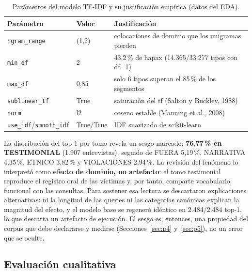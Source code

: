 \documentclass[11pt]{tg_usta}
\begin{document}
\begin{table}[htbp]
    \centering
    \caption{Parámetros del modelo TF-IDF y su justificación empírica (datos del EDA).}
    \small
    \setlength{\tabcolsep}{5pt}
    \begin{tabular}{l l p{7.1cm}}
    \toprule
    Parámetro & Valor & Justificación \\
    \midrule
    \texttt{ngram\_range} & (1,2) & colocaciones de dominio que los unigramas pierden \\
    \texttt{min\_df} & 2 & 43,2\,\% de hapax (14.365/33.277 tipos con df=1) \\
    \texttt{max\_df} & 0,85 & solo 6 tipos superan el 85\,\% de los segmentos \\
    \texttt{sublinear\_tf} & True & saturación del tf (Salton y Buckley, 1988) \\
    \texttt{norm} & l2 & coseno estable (Manning et al., 2008) \\
    \texttt{use\_idf}/\texttt{smooth\_idf} & True/True & IDF suavizado de scikit-learn \\
    \bottomrule
    \end{tabular}
    \label{tab:config-tfidf}
\end{table}

La distribución del top-1 por tomo revela un sesgo marcado: \textbf{76,77\,\% en TESTIMONIAL} (1.907 entrevistas), seguido de FUERA 5,19\,\%, NARRATIVA 4,35\,\%, ETNICO 3,82\,\% y VIOLACIONES 2,94\,\%. La revisión del fenómeno lo interpretó como \textbf{efecto de dominio, no artefacto}: el tomo testimonial reproduce el registro oral de las víctimas \cite{castillejo2023escuchar} y, por tanto, comparte vocabulario funcional con las consultas. Para sostener esa lectura se descartaron explicaciones alternativas: ni la longitud de las queries ni las categorías canónicas explican la magnitud del efecto, y el modelo base se regeneró idéntico en 2.484/2.484 top-1, lo que descarta un artefacto de ejecución. El sesgo es, entonces, una propiedad del corpus que debe declararse y medirse (Secciones~\ref{sec:p4} y~\ref{sec:p5}), no un error que se oculte.

\subsection{Evaluación cualitativa}
\end{document}
